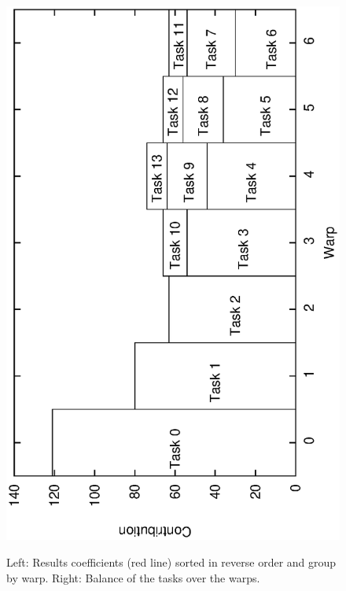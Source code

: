 \documentclass[oribibl]{llncs2e/llncs}
\begin{document}
\begin{enumerate}
\begin{figure}[t]
\begin{center}
{\includegraphics[scale=0.37, angle=-90]{warp.eps} 
}
\caption{Left: Results coefficients (red line) sorted in reverse order and group by warp. Right: Balance of the tasks over the warps.}
\label{algo_GPU}
\end{center}
\end{figure}


\end{enumerate}
\end{document}
